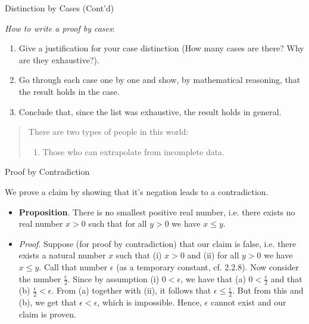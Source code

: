 \begin{frame}{Distinction by Cases (Cont'd)}

	 \emph{How to write a proof by cases}:
			
				\begin{enumerate}[1.]
				
					\item Give a justification for your case distinction (How many cases are there? Why are they exhaustive?).
					
					\item Go through each case one by one and show, by mathematical reasoning, that the result holds in the case.
					
					\item Conclude that, since the list was exhaustive, the result holds in general.
				
				\end{enumerate}
				
		
		\begin{quote}
		There are two types of people in this world:
		
		\begin{enumerate}[1)]
		
			\item Those who can extrapolate from incomplete data.
		
		\end{enumerate}
		\begin{flushright}
		\end{flushright}
		
		\end{quote}

\end{frame}

\begin{frame}{Proof by Contradiction}

We prove a claim by showing that it's negation leads to a contradiction.

\begin{itemize}

\item \textbf{Proposition}. 				There is no smallest positive real number, i.e. there exists no real number $x>0$ such that for all $y>0$ we have $x\leq y$.  

\item \emph{Proof}. 				Suppose (for proof by contradiction) that our claim is false, i.e. there exists a natural number $x$ such that (i) $x>0$ and (ii) for all $y>0$ we have $x\leq y$. Call that number $\epsilon$ (as a temporary constant, cf. 2.2.8). Now consider the number $\frac{\epsilon}{2}$. Since by assumption (i) $0<\epsilon$, we have that (a) $0<\frac{\epsilon}{2}$ and that (b) $\frac{\epsilon}{2}<\epsilon$. From (a) together with (ii), it follows that $\epsilon\leq \frac{\epsilon}{2}$. But from this and (b), we get that $\epsilon<\epsilon$, which is impossible. Hence, $\epsilon$ cannot exist and our claim is proven. 

\end{itemize}

\end{frame}


